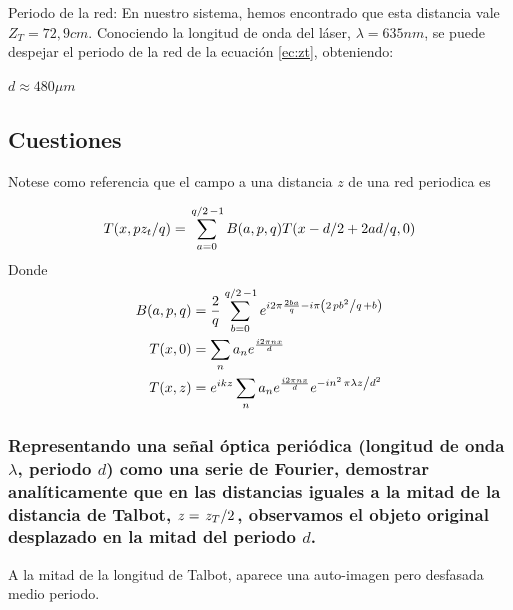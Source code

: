 \documentclass{./packages/optica-article}
\begin{document}
Periodo de la red:
En nuestro sistema, hemos encontrado que esta distancia vale $Z_T = 72,9 cm$. Conociendo la longitud de onda del láser, $\lambda = 635 nm$, se puede despejar el periodo de la red de la ecuación \ref{ec:zt}, obteniendo:
\begin{center}
	$d \approx 480 \mu m$
\end{center}


\subsection{Cuestiones}

Notese como referencia que el campo a una distancia $z$ de una red periodica es

\begin{equation}\label{eq:talbot}
	T(x, p z_t / q ) = \sum_{a=0}^{\flatfrac q 2 - 1} B(a, p, q) T (x - d/2 + 2ad/q, 0)
\end{equation}
Donde
\begin{align}
	\label{eq:talbot:t}
	B(a,p,q) & = \frac 2 q \sum_{b=0}^{\flatfrac q 2 - 1} e^{i 2 \pi \frac{2ba}{q} - i\pi \left(2 \flatfrac{p b^2}{q} + b\right)} \\
	T(x,0)   & =
	\sum_{n} a_n e^{\frac{i 2 \pi n x} {d}}\\
	T(x,z)   & =
	e^{ikz}
	\sum_{n} a_n e^{\frac{i 2 \pi n x} {d}} e^{- i n^2 \flatfrac{ \pi \lambda z } {d^2}}
\end{align}

\subsubsection{Representando una señal óptica periódica (longitud de onda $\lambda$, periodo $d$) como una serie de Fourier, demostrar analíticamente que en las distancias iguales a la mitad de la distancia de Talbot, $z=\flatfrac{z_{T}}{2}$, observamos el objeto original desplazado en la mitad del periodo $d$.}


	      A la mitad de la longitud de Talbot, aparece una auto-imagen pero desfasada medio periodo.
\end{document}
